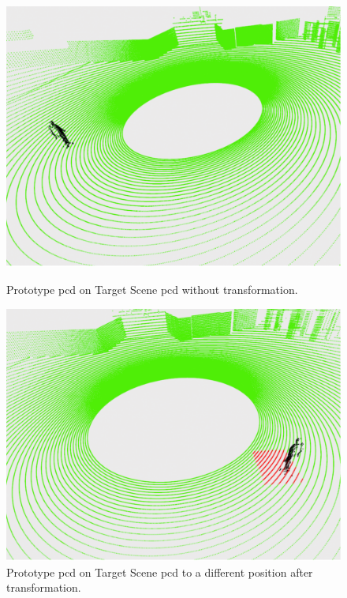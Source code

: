 \begin{figure}[htbp]
    \centering
    \begin{minipage}[b]{0.45\textwidth}
    \centering
    \includegraphics[width=1\linewidth]{97_graphics/results/prototype_on_target_scene_original_location.pdf}
    \caption{Prototype \acrshort{pcd} on Target Scene \acrshort{pcd} without transformation.}
    \label{fig:result-prototype_on_target_scene_original_location}
    \end{minipage}
    \hfill
    \begin{minipage}[b]{0.45\textwidth}
    \centering
    \includegraphics[width=1\linewidth]{97_graphics/results/prototype_on_target_scene_different_location.pdf}
    \caption{Prototype \acrshort{pcd} on Target Scene \acrshort{pcd} to a different position after transformation.}
    \label{fig:result-prototype_on_target_scene_different_location}
    \end{minipage}
\end{figure}

